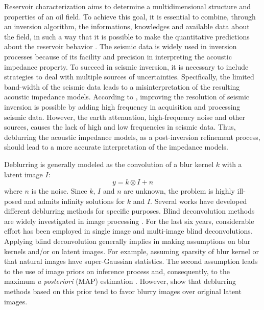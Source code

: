 \documentclass[conference,compsoc]{IEEEtran}
\begin{document}
Reservoir characterization aims to determine a multidimensional
structure and properties of an oil field. To achieve this goal, it is essential to combine, through an
inversion algorithm, the informations, knowledges and available data about the field,
in such a way that it is possible to make the
quantitative predictions about the reservoir behavior \cite{buiting}.
The seismic data is widely used in inversion processes because of its facility and precision
in interpreting the acoustic impedance property.
To succeed in seismic inversion, it is necessary to include strategies to deal with multiple
sources of uncertainties. Specifically, the limited band-width of the seismic data leads to
a misinterpretation of the resulting acoustic impedance models.
According to \cite{xiaoiu}, improving the resolution of seismic inversion is
possible by adding high frequency in acquisition and processing seismic data.
However, the earth attenuation, high-frequency noise and other sources, causes 
the lack of high and low frequencies in seismic data. 
Thus, deblurring the acoustic impedance models, as a post-inversion refinement process, should lead to a more accurate
interpretation of the impedance models.

Deblurring is generally modeled as the convolution of a blur kernel $k$
with a latent image $I$: 
\begin{equation}
 y = k \otimes I + n
 \label{eq:deblurr}
\end{equation}
where $n$ is the noise. Since $k$, $I$ and $n$ are unknown, the problem 
is highly ill-posed and admits infinity solutions for $k$ and $I$.
Several works have developed different deblurring methods for specific purposes.
Blind deconvolution methods are widely investigated in image processing \cite{bishop}.
For the last six years, considerable effort has been employed in single image
\cite{babacan,Krishnan2015,Levin2011,Zhang2011} and multi-image \cite{sroubek2012,Zhu2012} blind deconvolutions. 
Applying blind deconvolution generally implies in making assumptions on
blur kernels and/or on latent images. For example, assuming sparsity of blur kernel
or that natural images have super-Gaussian statistics. The second assumption
leads to the use of image priors on inference process and, consequently, to the maximum \textit{a posteriori}
(MAP) estimation \cite{babacan}. However, \cite{Levin} show that deblurring methods
based on this prior tend to favor blurry images over original latent images.
\end{document}
